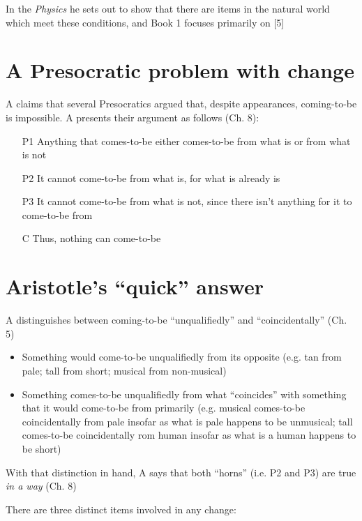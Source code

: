 \documentclass[oneside]{article}
\begin{document}
\noindent In the \emph{Physics} he sets out to show that there are items in the natural world which meet these conditions, and Book 1 focuses primarily on [5]
\vspace*{-3mm}

\section*{A Presocratic problem with change}

\noindent A claims that several Presocratics argued that, despite appearances, coming-to-be is impossible. A presents their argument as follows (Ch. 8):

\begin{enumerate}
\item [P1] Anything that comes-to-be either comes-to-be from what is or from what is not
\item [P2] It cannot come-to-be from what is, for what is already is
\item [P3] It cannot come-to-be from what is not, since there isn't anything for it to come-to-be from
\item  [C] Thus, nothing can come-to-be
\end{enumerate}

\section*{Aristotle's ``quick'' answer}

\noindent A distinguishes between coming-to-be ``unqualifiedly'' and ``coincidentally'' (Ch. 5)
\begin{itemize}\item{Something would come-to-be unqualifiedly from its opposite (e.g. tan from pale; tall from short; musical from non-musical)}\item{Something comes-to-be unqualifiedly from what ``coincides'' with something that it would come-to-be from primarily (e.g. musical comes-to-be coincidentally from pale insofar as what is pale happens to be unmusical; tall comes-to-be coincidentally rom human insofar as what is a human happens to be short)}\end{itemize}

\noindent With that distinction in hand, A says that both ``horns'' (i.e. P2 and P3) are true \emph{in a way} (Ch. 8)
\vspace*{2mm}

\noindent There are three distinct items involved in any change:
\vspace*{1mm}
\end{document}
